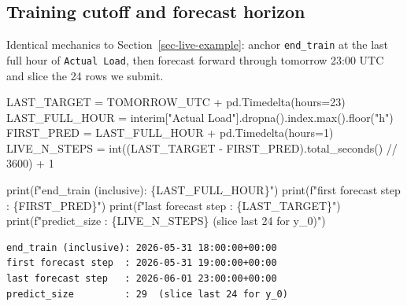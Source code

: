 \documentclass[
  english,
  letterpaper,
]{scrbook}
\newenvironment{Shaded}{\begin{snugshade}}{\end{snugshade}}
\newcommand{\BuiltInTok}[1]{\textcolor[rgb]{0.00,0.23,0.31}{#1}}
\newcommand{\DecValTok}[1]{\textcolor[rgb]{0.68,0.00,0.00}{#1}}
\newcommand{\NormalTok}[1]{\textcolor[rgb]{0.00,0.23,0.31}{#1}}
\newcommand{\OperatorTok}[1]{\textcolor[rgb]{0.37,0.37,0.37}{#1}}
\newcommand{\SpecialCharTok}[1]{\textcolor[rgb]{0.37,0.37,0.37}{#1}}
\newcommand{\SpecialStringTok}[1]{\textcolor[rgb]{0.13,0.47,0.30}{#1}}
\newcommand{\StringTok}[1]{\textcolor[rgb]{0.13,0.47,0.30}{#1}}
\begin{document}
\subsection{Training cutoff and forecast
horizon}\label{sec-team4-cutoff}

Identical mechanics to Section~\ref{sec-live-example}: anchor
\texttt{end\_train} at the last full hour of \texttt{Actual\ Load}, then
forecast forward through tomorrow 23:00 UTC and slice the 24 rows we
submit.

\protect{}\label{team4-cutoff}
\begin{Shaded}
\begin{Highlighting}[]
\NormalTok{LAST\_TARGET }\OperatorTok{=}\NormalTok{ TOMORROW\_UTC }\OperatorTok{+}\NormalTok{ pd.Timedelta(hours}\OperatorTok{=}\DecValTok{23}\NormalTok{)}
\NormalTok{LAST\_FULL\_HOUR }\OperatorTok{=}\NormalTok{ interim[}\StringTok{"Actual Load"}\NormalTok{].dropna().index.}\BuiltInTok{max}\NormalTok{().floor(}\StringTok{"h"}\NormalTok{)}
\NormalTok{FIRST\_PRED }\OperatorTok{=}\NormalTok{ LAST\_FULL\_HOUR }\OperatorTok{+}\NormalTok{ pd.Timedelta(hours}\OperatorTok{=}\DecValTok{1}\NormalTok{)}
\NormalTok{LIVE\_N\_STEPS }\OperatorTok{=} \BuiltInTok{int}\NormalTok{((LAST\_TARGET }\OperatorTok{{-}}\NormalTok{ FIRST\_PRED).total\_seconds() }\OperatorTok{//} \DecValTok{3600}\NormalTok{) }\OperatorTok{+} \DecValTok{1}

\BuiltInTok{print}\NormalTok{(}\SpecialStringTok{f"end\_train (inclusive): }\SpecialCharTok{\{}\NormalTok{LAST\_FULL\_HOUR}\SpecialCharTok{\}}\SpecialStringTok{"}\NormalTok{)}
\BuiltInTok{print}\NormalTok{(}\SpecialStringTok{f"first forecast step  : }\SpecialCharTok{\{}\NormalTok{FIRST\_PRED}\SpecialCharTok{\}}\SpecialStringTok{"}\NormalTok{)}
\BuiltInTok{print}\NormalTok{(}\SpecialStringTok{f"last forecast step   : }\SpecialCharTok{\{}\NormalTok{LAST\_TARGET}\SpecialCharTok{\}}\SpecialStringTok{"}\NormalTok{)}
\BuiltInTok{print}\NormalTok{(}\SpecialStringTok{f"predict\_size         : }\SpecialCharTok{\{}\NormalTok{LIVE\_N\_STEPS}\SpecialCharTok{\}}\SpecialStringTok{  (slice last 24 for y\_0)"}\NormalTok{)}
\end{Highlighting}
\end{Shaded}

\begin{verbatim}
end_train (inclusive): 2026-05-31 18:00:00+00:00
first forecast step  : 2026-05-31 19:00:00+00:00
last forecast step   : 2026-06-01 23:00:00+00:00
predict_size         : 29  (slice last 24 for y_0)
\end{verbatim}
\end{document}
